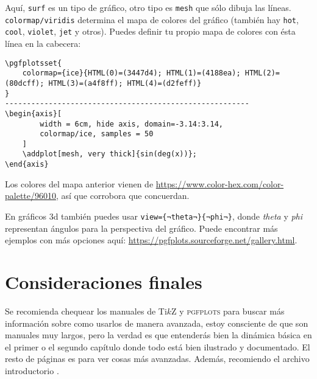 \documentclass[intro-breve-latex.tex]{subfiles}
\begin{document}
Aquí, \texttt{surf} es un tipo de gráfico, otro tipo es \texttt{mesh} que sólo dibuja las líneas.
\texttt{colormap/viridis} determina el mapa de colores del gráfico (también hay \texttt{hot}, \texttt{cool}, \texttt{violet}, \texttt{jet} y otros).
Puedes definir tu propio mapa de colores con ésta línea en la cabecera:\pagebreak
\begin{lstlisting}
\pgfplotsset{
	colormap={ice}{HTML(0)=(3447d4); HTML(1)=(4188ea); HTML(2)=(80dcff); HTML(3)=(a4f8ff); HTML(4)=(d2feff)}
}
--------------------------------------------------------
\begin{axis}[
		width = 6cm, hide axis, domain=-3.14:3.14,
		colormap/ice, samples = 50
	]
	\addplot[mesh, very thick]{sin(deg(x))};
\end{axis}
\end{lstlisting}
\begin{figure}[!h]
	\centering
\end{figure}

Los colores del mapa anterior vienen de \url{https://www.color-hex.com/color-palette/96010}, así que corrobora que concuerdan.

En gráficos 3d también puedes usar \lstinline|view={¬theta¬}{¬phi¬}|, donde \textit{theta} y \textit{phi} representan
ángulos para la perspectiva del gráfico.
Puede encontrar más ejemplos con más opciones aquí: \url{https://pgfplots.sourceforge.net/gallery.html}.

\section{Consideraciones finales}
Se recomienda chequear los manuales de Ti$k$Z \cite{tikz} y \textsc{pgfplots} \cite{pgfplots} para buscar más
información sobre como usarlos de manera avanzada, estoy consciente de que son manuales muy largos, pero la verdad es
que entenderás bien la dinámica básica en el primer o el segundo capítulo donde todo está bien ilustrado y documentado.
El resto de páginas es para ver cosas más avanzadas.
Además, recomiendo el archivo introductorio \cite{cremer:tikz}.
\end{document}
